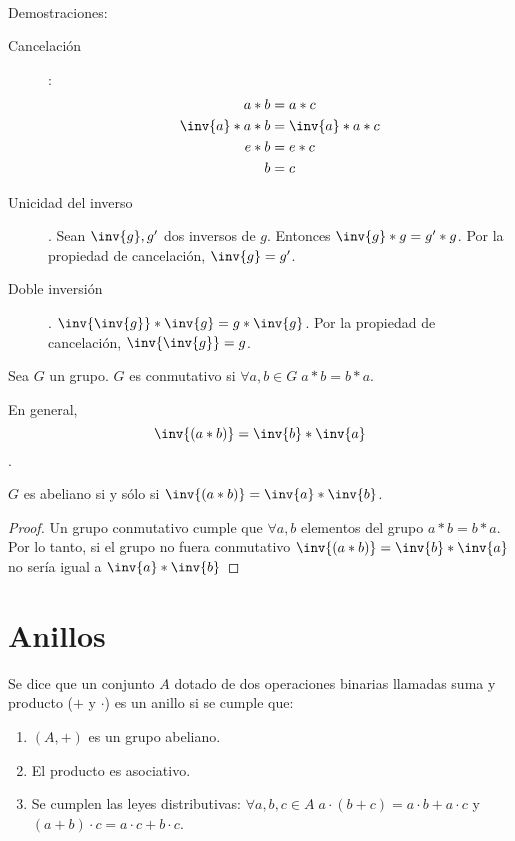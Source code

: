 \documentclass[nochap]{apuntes}
\begin{document}
\indent \\
Demostraciones:

\begin{description}
\item[Cancelación]: 
\begin{align*}
a\ast b &= a \ast c \\
\inv{a} \ast a \ast b &= \inv{a} \ast a \ast c \\
e \ast b &= e \ast c \\
b&=c
\end{align*}
\item[Unicidad del inverso]. Sean $\inv{g}, g'$ dos inversos de $g$. Entonces $\inv{g}\ast g = g' \ast g$. Por la propiedad de cancelación, $\inv{g}=g'$.
\\
\item[Doble inversión]. $\inv{\inv{g}} \ast \inv{g} = g \ast \inv{g}$. Por la propiedad de cancelación, $\inv{\inv{g}} = g$.
\end{description}

\begin{defn} Sea $G$ un grupo. $G$ es conmutativo si $\forall a,b \in G\; a\ast b =b \ast a$.\end{defn}

\begin{remark} En general, \[ \inv{\left(a\ast b\right)} = \inv{b}\ast \inv{a}\].\end{remark}

\begin{prop} $G$ es abeliano si y sólo si $\inv{(a\ast b)}=\inv{a} \ast \inv{b}$.\end{prop}

\begin{proof}
Un grupo conmutativo cumple que $\forall a,b$ elementos del grupo $a \ast b =b \ast a$. Por lo tanto, si el grupo no fuera conmutativo $\inv{(a\ast b)}=\inv{b}\ast \inv{a}$ no sería igual a $\inv{a} \ast \inv{b}$
\end{proof}

\section{Anillos}
\begin{defn}[Anillo] Se dice que un conjunto $A$ dotado de dos operaciones binarias llamadas suma y producto ($+$ y $\cdot$) es un anillo si se cumple que: 
\begin{enumerate}
\item $(A, +)$ es un grupo abeliano.
\item El producto es asociativo.
\item Se cumplen las leyes distributivas: $\forall a,b,c \in A \; a\cdot(b+c)=a\cdot b + a\cdot c$ y $(a+b)\cdot c= a \cdot c + b \cdot c$.
\end{enumerate}
\end{defn}
\end{document}
